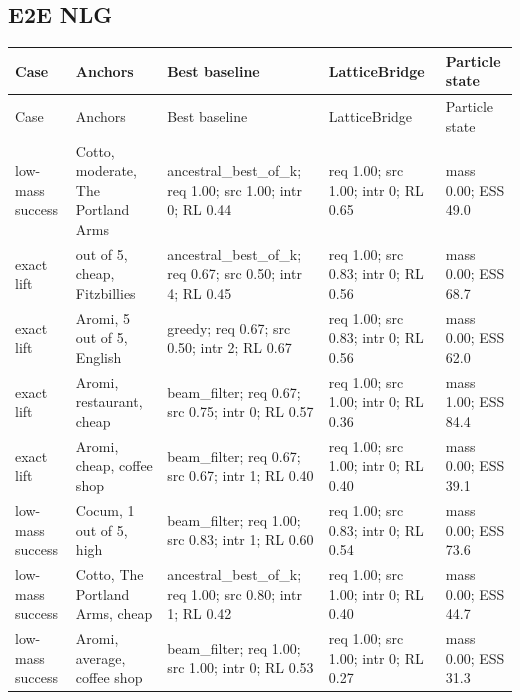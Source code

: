\subsection*{E2E NLG}
\begin{longtable}{>{\raggedright\arraybackslash}p{}>{\raggedright\arraybackslash}p{}>{\raggedright\arraybackslash}p{}>{\raggedright\arraybackslash}p{}>{\raggedright\arraybackslash}p{}}
\toprule
Case & Anchors & Best baseline & LatticeBridge & Particle state \\
\midrule
\endfirsthead
\toprule
Case & Anchors & Best baseline & LatticeBridge & Particle state \\
\midrule
\endhead
low-mass success & Cotto, moderate, The Portland Arms & ancestral\_best\_of\_k; req 1.00; src 1.00; intr 0; RL 0.44 & req 1.00; src 1.00; intr 0; RL 0.65 & mass 0.00; ESS 49.0 \\
\midrule
exact lift & 5 out of 5, cheap, Fitzbillies & ancestral\_best\_of\_k; req 0.67; src 0.50; intr 4; RL 0.45 & req 1.00; src 0.83; intr 0; RL 0.56 & mass 0.00; ESS 68.7 \\
\midrule
exact lift & Aromi, 5 out of 5, English & greedy; req 0.67; src 0.50; intr 2; RL 0.67 & req 1.00; src 0.83; intr 0; RL 0.56 & mass 0.00; ESS 62.0 \\
\midrule
exact lift & Aromi, restaurant, cheap & beam\_filter; req 0.67; src 0.75; intr 0; RL 0.57 & req 1.00; src 1.00; intr 0; RL 0.36 & mass 1.00; ESS 84.4 \\
\midrule
exact lift & Aromi, cheap, coffee shop & beam\_filter; req 0.67; src 0.67; intr 1; RL 0.40 & req 1.00; src 1.00; intr 0; RL 0.40 & mass 0.00; ESS 39.1 \\
\midrule
low-mass success & Cocum, 1 out of 5, high & beam\_filter; req 1.00; src 0.83; intr 1; RL 0.60 & req 1.00; src 0.83; intr 0; RL 0.54 & mass 0.00; ESS 73.6 \\
\midrule
low-mass success & Cotto, The Portland Arms, cheap & ancestral\_best\_of\_k; req 1.00; src 0.80; intr 1; RL 0.42 & req 1.00; src 1.00; intr 0; RL 0.40 & mass 0.00; ESS 44.7 \\
\midrule
low-mass success & Aromi, average, coffee shop & beam\_filter; req 1.00; src 1.00; intr 0; RL 0.53 & req 1.00; src 1.00; intr 0; RL 0.27 & mass 0.00; ESS 31.3 \\
\midrule
\bottomrule
\end{longtable}

